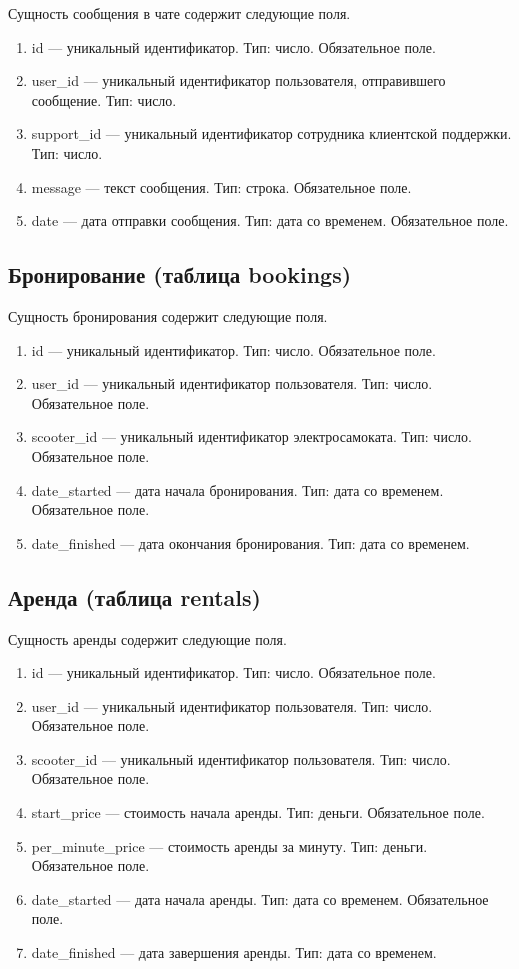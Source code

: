 Сущность сообщения в чате содержит следующие поля.

\begin{enumerate}
    \item id --- уникальный идентификатор. Тип: число. Обязательное поле.
    \item user\_id --- уникальный идентификатор пользователя, отправившего сообщение. Тип: число.
    \item support\_id --- уникальный идентификатор сотрудника клиентской поддержки. Тип: число.
    \item message --- текст сообщения. Тип: строка. Обязательное поле.
    \item date --- дата отправки сообщения. Тип: дата со временем. Обязательное поле.
\end{enumerate}

\subsection{Бронирование (таблица bookings)}

Сущность бронирования содержит следующие поля.

\begin{enumerate}
    \item id --- уникальный идентификатор. Тип: число. Обязательное поле.
    \item user\_id --- уникальный идентификатор пользователя. Тип: число. Обязательное поле.
    \item scooter\_id --- уникальный идентификатор электросамоката. Тип: число. Обязательное поле.
    \item date\_started --- дата начала бронирования. Тип: дата со временем. Обязательное поле.
    \item date\_finished --- дата окончания бронирования. Тип: дата со временем.
\end{enumerate}

\subsection{Аренда (таблица rentals)}

Сущность аренды содержит следующие поля.

\begin{enumerate}
    \item id --- уникальный идентификатор. Тип: число. Обязательное поле.
    \item user\_id --- уникальный идентификатор пользователя. Тип: число. Обязательное поле.
    \item scooter\_id --- уникальный идентификатор пользователя. Тип: число. Обязательное поле.
    \item start\_price --- стоимость начала аренды. Тип: деньги. Обязательное поле.
    \item per\_minute\_price --- стоимость аренды за минуту. Тип: деньги. Обязательное поле.
    \item date\_started --- дата начала аренды. Тип: дата со временем. Обязательное поле.
    \item date\_finished --- дата завершения аренды. Тип: дата со временем.
\end{enumerate}

